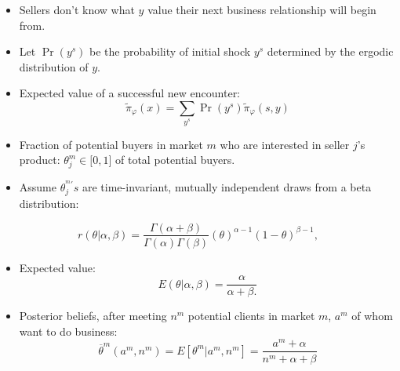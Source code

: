 \documentclass[notes=show]{beamer}
\begin{document}
\begin{frame}%



\begin{itemize}
\item Sellers don't know what $y$ value their next business relationship
will begin from.

\item Let $\Pr (y^{s})$ be the probability of initial shock $y^{s}$
determined by the ergodic distribution of $y$.

\item Expected value of a successful new encounter:%
\[
\widetilde{\pi }_{\varphi }(x)=\sum_{y^{s}}\Pr (y^{s})\widetilde{\pi }%
_{\varphi }(s,y) 
\]
\end{itemize}

\end{frame}%
\begin{frame}%



\begin{itemize}
\item Fraction of potential buyers in market $m$ who are interested in
seller $j$'s product: $\theta _{j}^{m}\in \lbrack 0,1]$ of total potential
buyers.

\item Assume $\theta _{j}^{^{m}\prime }s$ are time-invariant, mutually
independent draws from a beta distribution:
\end{itemize}

\[
r(\theta |\alpha ,\beta )=\frac{\Gamma (\alpha +\beta )}{\Gamma (\alpha
)\Gamma (\beta )}\left( \theta \right) ^{\alpha -1}(1-\theta )^{\beta -1}, 
\]

\begin{itemize}
\item Expected value:%
\[
E(\theta |\alpha ,\beta )=\frac{\alpha }{\alpha +\beta .} 
\]

\item Posterior beliefs, after meeting $n^{m}$ potential clients in market $%
m $, $a^{m}$ of whom want to do business:%
\hyperref{}{}{Bayesian_details}{}%
\[
\overline{\theta }^{m}(a^{m},n^{m})=E\left[ \theta ^{m}|a^{m},n^{m}\right] =%
\frac{a^{m}+\alpha }{n^{m}+\alpha +\beta } 
\]
\end{itemize}

\end{frame}%
\end{document}
